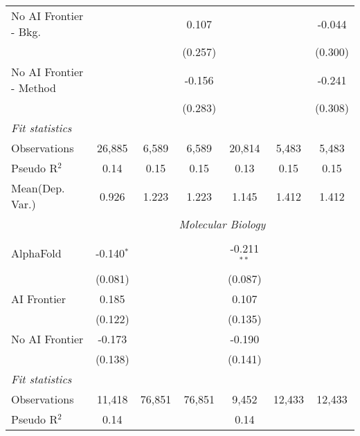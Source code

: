\begin{tabular}{lcccccc}
   No AI Frontier - Bkg.   &         &         & 0.107   &                &         & -0.044\\   
                           &         &         & (0.257) &                &         & (0.300)\\   
   No AI Frontier - Method &         &         & -0.156  &                &         & -0.241\\   
                           &         &         & (0.283) &                &         & (0.308)\\   
   \midrule
   \emph{Fit statistics}\\
   Observations            & 26,885  & 6,589   & 6,589   & 20,814         & 5,483   & 5,483\\  
   Pseudo R$^2$            & 0.14    & 0.15    & 0.15    & 0.13           & 0.15    & 0.15\\  
Mean(Dep. Var.) & 0.926 & 1.223 & 1.223 & 1.145 & 1.412 & 1.412 \\
   
 & \multicolumn{6}{c}{\textit{Molecular Biology}} \\ \\
   AlphaFold      & -0.140$^{*}$ &        &        & -0.211$^{**}$ &        &   \\   
                  & (0.081)      &        &        & (0.087)       &        &   \\   
   AI Frontier    & 0.185        &        &        & 0.107         &        &   \\   
                  & (0.122)      &        &        & (0.135)       &        &   \\   
   No AI Frontier & -0.173       &        &        & -0.190        &        &   \\   
                  & (0.138)      &        &        & (0.141)       &        &   \\   
   \midrule
   \emph{Fit statistics}\\
   Observations   & 11,418       & 76,851 & 76,851 & 9,452         & 12,433 & 12,433\\  
   Pseudo R$^2$   & 0.14         &        &        & 0.14          &        & \\  
   

\end{tabular}
